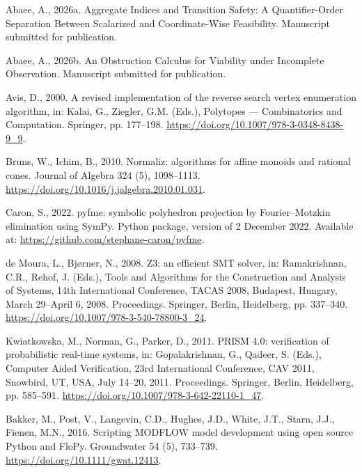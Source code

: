 \documentclass[3p,11pt]{elsarticle}
\begin{document}

\begin{thebibliography}{}
\providecommand{\natexlab}[1]{#1}

Abaee, A., 2026a. Aggregate Indices and Transition Safety: A Quantifier-Order
Separation Between Scalarized and Coordinate-Wise Feasibility. Manuscript
submitted for publication.

Abaee, A., 2026b. An Obstruction Calculus for Viability under Incomplete
Observation. Manuscript submitted for publication.


Avis, D., 2000. A revised implementation of the reverse search vertex
enumeration algorithm, in: Kalai, G., Ziegler, G.M. (Eds.), Polytopes ---
Combinatorics and Computation. Springer, pp. 177--198.
\url{https://doi.org/10.1007/978-3-0348-8438-9\_9}.

Bruns, W., Ichim, B., 2010. Normaliz: algorithms for affine monoids and
rational cones. Journal of Algebra 324 (5), 1098--1113.
\url{https://doi.org/10.1016/j.jalgebra.2010.01.031}.

Caron, S., 2022. pyfme: symbolic polyhedron projection by Fourier--Motzkin
elimination using SymPy. Python package, version of 2 December 2022.
Available at: \url{https://github.com/stephane-caron/pyfme}.

de Moura, L., Bj{\o}rner, N., 2008. Z3: an efficient SMT solver, in:
Ramakrishnan, C.R., Rehof, J. (Eds.), Tools and Algorithms for the
Construction and Analysis of Systems, 14th International Conference, TACAS
2008, Budapest, Hungary, March 29--April 6, 2008. Proceedings. Springer,
Berlin, Heidelberg, pp. 337--340.
\url{https://doi.org/10.1007/978-3-540-78800-3\_24}.

Kwiatkowska, M., Norman, G., Parker, D., 2011. PRISM 4.0: verification of
probabilistic real-time systems, in: Gopalakrishnan, G., Qadeer, S. (Eds.),
Computer Aided Verification, 23rd International Conference, CAV 2011,
Snowbird, UT, USA, July 14--20, 2011. Proceedings. Springer, Berlin,
Heidelberg, pp. 585--591. \url{https://doi.org/10.1007/978-3-642-22110-1\_47}.

Bakker, M., Post, V., Langevin, C.D., Hughes, J.D., White, J.T., Starn,
J.J., Fienen, M.N., 2016. Scripting MODFLOW model development using open
source Python and FloPy. Groundwater 54 (5), 733--739.
\url{https://doi.org/10.1111/gwat.12413}.


\end{thebibliography}
\end{document}
